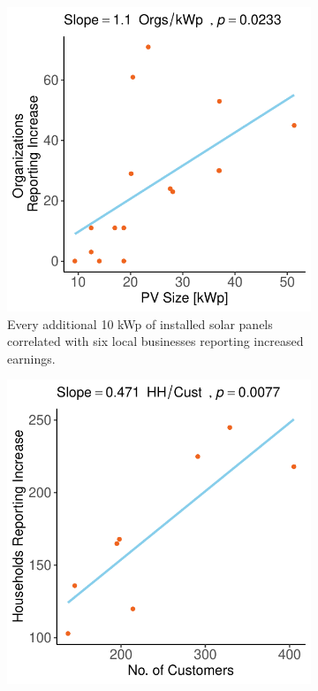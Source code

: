 \begin{figure}[t]
    \centering
    \begin{subfigure}[t]{0.48\textwidth}
        \centering
        \includegraphics[width=\textwidth]{images/earnings_change_regression_community.pdf}
        \caption{Every additional 10 kWp of installed solar panels correlated with six local businesses reporting increased earnings.}
        \label{fig:earnings_change}
    \end{subfigure}
    \hfill
    \begin{subfigure}[t]{0.48\textwidth}
        \centering
        \includegraphics[width=\textwidth]{images/kenya_avg_household_income_regression_community.pdf}

\end{subfigure}
\end{figure}
